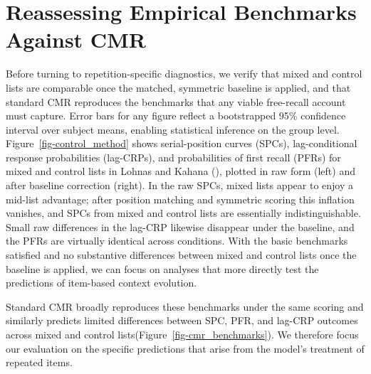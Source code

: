 \documentclass[
  man,
  floatsintext,
  longtable,
  nolmodern,
  notxfonts,
  notimes,
  draftfirst,
  colorlinks=true,linkcolor=blue,citecolor=blue,urlcolor=blue]{apa7}
\begin{document}
\section{Reassessing Empirical Benchmarks Against
CMR}\label{reassessing-empirical-benchmarks-against-cmr}

Before turning to repetition-specific diagnostics, we verify that mixed
and control lists are comparable once the matched, symmetric baseline is
applied, and that standard CMR reproduces the benchmarks that any viable
free-recall account must capture. Error bars for any figure reflect a
bootstrapped 95\% confidence interval over subject means, enabling
statistical inference on the group level.
Figure~\ref{fig-control_method} shows serial-position curves (SPCs),
lag-conditional response probabilities (lag-CRPs), and probabilities of
first recall (PFRs) for mixed and control lists in Lohnas and Kahana
(), plotted in raw form (left)
and after baseline correction (right). In the raw SPCs, mixed lists
appear to enjoy a mid-list advantage; after position matching and
symmetric scoring this inflation vanishes, and SPCs from mixed and
control lists are essentially indistinguishable. Small raw differences
in the lag-CRP likewise disappear under the baseline, and the PFRs are
virtually identical across conditions. With the basic benchmarks
satisfied and no substantive differences between mixed and control lists
once the baseline is applied, we can focus on analyses that more
directly test the predictions of item-based context evolution.

Standard CMR broadly reproduces these benchmarks under the same scoring
and similarly predicts limited differences between SPC, PFR, and lag-CRP
outcomes across mixed and control
lists(Figure~\ref{fig-cmr_benchmarks}). We therefore focus our
evaluation on the specific predictions that arise from the model's
treatment of repeated items.
\end{document}
